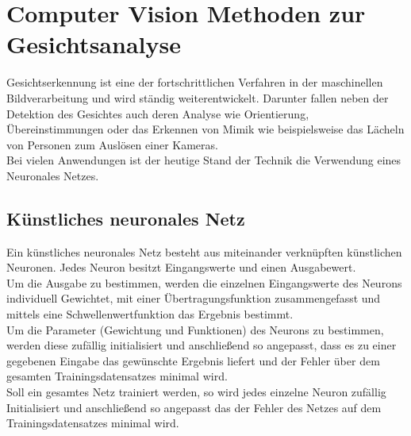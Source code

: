 \section{Computer Vision Methoden zur Gesichtsanalyse}
Gesichtserkennung ist eine der fortschrittlichen Verfahren in der maschinellen Bildverarbeitung und wird ständig weiterentwickelt. Darunter fallen neben der Detektion des Gesichtes auch deren Analyse wie Orientierung, Übereinstimmungen oder das Erkennen von Mimik wie beispielsweise das Lächeln von Personen zum Auslösen einer Kameras.\\
Bei vielen Anwendungen ist der heutige Stand der Technik die Verwendung eines Neuronales Netzes.
\subsection{Künstliches neuronales Netz}
Ein künstliches neuronales Netz besteht aus miteinander verknüpften künstlichen Neuronen. Jedes Neuron besitzt Eingangswerte und einen Ausgabewert.\\
Um die Ausgabe zu bestimmen, werden die einzelnen Eingangswerte des Neurons individuell Gewichtet, mit einer Übertragungsfunktion zusammengefasst und mittels eine Schwellenwertfunktion das Ergebnis bestimmt.\\
Um die Parameter (Gewichtung und Funktionen) des Neurons zu bestimmen, werden diese zufällig initialisiert und anschließend so angepasst, dass es zu einer gegebenen Eingabe das gewünschte Ergebnis liefert und der Fehler über dem gesamten Trainingsdatensatzes minimal wird.\\
Soll ein gesamtes Netz trainiert werden, so wird jedes einzelne Neuron zufällig Initialisiert und anschließend so angepasst das der Fehler des Netzes auf dem Trainingsdatensatzes minimal wird.\\
\cite{Maschin_Neuron}
